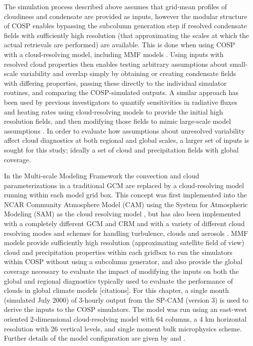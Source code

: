 The simulation process described above assumes that grid-mean profiles of cloudiness and condensate are provided as inputs, however the modular structure of COSP enables bypassing the subcolumn generation step if resolved condensate fields with sufficiently high resolution (that approximating the scales at which the actual retrievals are performed) are available. This is done when using COSP with a cloud-resolving model, including MMF models \citep[e.g.,][]{marchand_et_al_2009, marchand_and_ackerman_2010}. Using inputs with resolved cloud properties then enables testing arbitrary assumptions about small-scale variability and overlap simply by obtaining or creating condensate fields with differing properties, passing these directly to the individual simulator routines, and comparing the COSP-simulated outputs. A similar approach has been used by previous investigators to quantify sensitivities in radiative fluxes and heating rates using cloud-resolving models to provide the initial high resolution fields, and then modifying those fields to mimic large-scale model assumptions \citep[e.g.,][]{barker_et_al_1999}. In order to evaluate how assumptions about unresolved variability affect cloud diagnostics at both regional and global scales, a larger set of inputs is sought for this study; ideally a set of cloud and precipitation fields with global coverage.

In the Multi-scale Modeling Framework \citep[MMF;][]{randall_et_al_2003} the convection and cloud parameterizations in a traditional GCM are replaced by a cloud-resolving model running within each model grid box. This concept was first implemented into the NCAR Community Atmosphere Model (CAM) using the System for Atmospheric Modeling (SAM) as the cloud resolving model \citep[SP-CAM;][]{khairoutdinov_and_randall_2001}, but has also been implemented with a completely different GCM and CRM \citep{tao_et_al_2009} and with a variety of different cloud resolving modes and schemes for handling turbulence, clouds and aerosols \citep[e.g.,][]{cheng_and_xu_2011, cheng_and_xu_2013}. MMF models provide sufficiently high resolution (approximating satellite field of view) cloud and precipitation properties within each gridbox to run the simulators within COSP without using a subcolumn generator, and also provide the global coverage necessary to evaluate the impact of modifying the inputs on both the global and regional diagnostics typically used to evaluate the performance of clouds in global climate models [citations].  For this chapter, a single month (simulated July 2000) of 3-hourly output from the SP-CAM (version 3) is used to derive the inputs to the COSP simulators. The model was run using an east-west oriented 2-dimensional cloud-resolving model with 64 columns, a 4 km horizontal resolution with 26 vertical levels, and single moment bulk microphysics scheme.  Further details of the model configuration are given by \cite{khairoutdinov_et_al_2005} and \cite{marchand_et_al_2009}.

